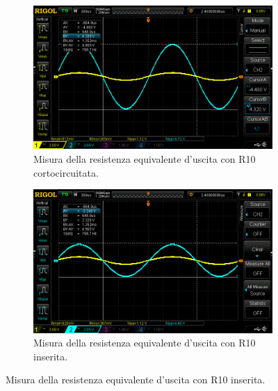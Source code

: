 \documentclass[a4paper]{article}
\begin{document}
				\begin{figure}[h!]
					\centering
					\begin{subfigure}{0.4\textwidth}
						\centering
						\includegraphics[scale=0.2]{misuraDellaResistenzaEquivalenteInIngressoAmplificatoreNonInvertenteR9InCorto}
						\caption{Misura della resistenza equivalente d'uscita con R10 cortocircuitata.}
					\end{subfigure}
					\begin{subfigure}{0.4\textwidth}
						\centering
						\includegraphics[scale=0.2]{misuraDellaResistenzaEquivalenteDiUscitaAmplificatoreNonInvertenteR10Inserita}
						\caption{Misura della resistenza equivalente d'uscita con R10 inserita.}
					\end{subfigure}
					\label{fig:misuraDellaResistenzaEquivalenteDiUscitaAmplificatoreNonInvertente}
				\end{figure}
\end{document}
